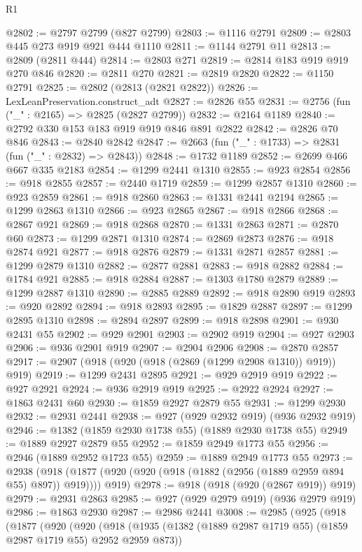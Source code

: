 \begin{lexlean}{R1}
\begin{coremodule}
@2802 := @2797 @2799 (@827 @2799)
@2803 := @1116 @2791
@2809 := @2803 @445 @273 @919 @921 @444 @1110
@2811 := @1144 @2791 @11
@2813 := @2809 (@2811 @444)
@2814 := @2803 @271
@2819 := @2814 @183 @919 @919 @270 @846
@2820 := @2811 @270
@2821 := @2819 @2820
@2822 := @1150 @2791
@2825 := @2802 (@2813 (@2821 @2822))
@2826 := LexLeanPreservation.construct_adt
@2827 := @2826 @55
@2831 := @2756 (fun ("_" : @2165) => @2825 (@2827 @2799))
@2832 := @2164 @1189
@2840 := @2792 @330 @153 @183 @919 @919 @846 @891 @2822
@2842 := @2826 @70 @846
@2843 := @2840 @2842
@2847 := @2663 (fun ("_" : @1733) => @2831 (fun ("_" : @2832) => @2843))
@2848 := @1732 @1189
@2852 := @2699 @466 @667 @335 @2183
@2854 := @1299 @2441 @1310
@2855 := @923 @2854
@2856 := @918 @2855
@2857 := @2440 @1719
@2859 := @1299 @2857 @1310
@2860 := @923 @2859
@2861 := @918 @2860
@2863 := @1331 @2441 @2194
@2865 := @1299 @2863 @1310
@2866 := @923 @2865
@2867 := @918 @2866
@2868 := @2867 @921
@2869 := @918 @2868
@2870 := @1331 @2863
@2871 := @2870 @60
@2873 := @1299 @2871 @1310
@2874 := @2869 @2873
@2876 := @918 @2874 @921
@2877 := @918 @2876
@2879 := @1331 @2871 @2857
@2881 := @1299 @2879 @1310
@2882 := @2877 @2881
@2883 := @918 @2882
@2884 := @1784 @921
@2885 := @918 @2884
@2887 := @1303 @1780 @2879
@2889 := @1299 @2887 @1310
@2890 := @2885 @2889
@2892 := @918 @2890 @919
@2893 := @920 @2892
@2894 := @918 @2893
@2895 := @1829 @2887
@2897 := @1299 @2895 @1310
@2898 := @2894 @2897
@2899 := @918 @2898
@2901 := @930 @2431 @55
@2902 := @929 @2901
@2903 := @2902 @919
@2904 := @927 @2903
@2906 := @936 @2901 @919
@2907 := @2904 @2906
@2908 := @2870 @2857
@2917 := @2907 (@918 (@920 (@918 (@2869 (@1299 @2908 @1310)) @919)) @919)
@2919 := @1299 @2431 @2895
@2921 := @929 @2919 @919
@2922 := @927 @2921
@2924 := @936 @2919 @919
@2925 := @2922 @2924
@2927 := @1863 @2431 @60
@2930 := @1859 @2927 @2879 @55
@2931 := @1299 @2930
@2932 := @2931 @2441
@2938 := @927 (@929 @2932 @919) (@936 @2932 @919)
@2946 := @1382 (@1859 @2930 @1738 @55) (@1889 @2930 @1738 @55)
@2949 := @1889 @2927 @2879 @55
@2952 := @1859 @2949 @1773 @55
@2956 := @2946 (@1889 @2952 @1723 @55)
@2959 := @1889 @2949 @1773 @55
@2973 := @2938
    (@918 (@1877 (@920 (@920 (@918 (@1882 (@2956 (@1889 @2959 @894 @55) @897)) @919)))) @919)
@2978 := @918 (@918 (@920 (@2867 @919)) @919)
@2979 := @2931 @2863
@2985 := @927 (@929 @2979 @919) (@936 @2979 @919)
@2986 := @1863 @2930
@2987 := @2986 @2441
@3008 := @2985
    (@925
      (@918
        (@1877
          (@920
            (@920
              (@918
                (@1935 (@1382 (@1889 @2987 @1719 @55) (@1859 @2987 @1719 @55) @2952 @2959 @873))

\end{coremodule}
\end{lexlean}
